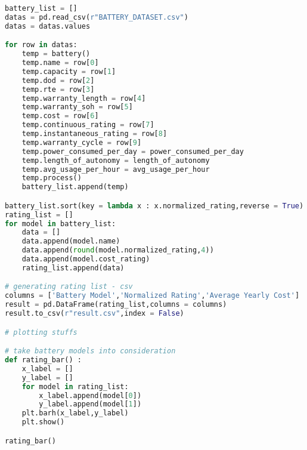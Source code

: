 \begin{lstlisting}[language=python]
battery_list = []
datas = pd.read_csv(r"BATTERY_DATASET.csv")
datas = datas.values

for row in datas:
    temp = battery()
    temp.name = row[0]
    temp.capacity = row[1]
    temp.dod = row[2]
    temp.rte = row[3]
    temp.warranty_length = row[4]
    temp.warranty_soh = row[5]
    temp.cost = row[6]
    temp.continuous_rating = row[7]
    temp.instantaneous_rating = row[8]
    temp.warranty_cycle = row[9]
    temp.power_consumed_per_day = power_consumed_per_day
    temp.length_of_autonomy = length_of_autonomy
    temp.avg_usage_per_hour = avg_usage_per_hour
    temp.process()
    battery_list.append(temp)

battery_list.sort(key = lambda x : x.normalized_rating,reverse = True)
rating_list = []
for model in battery_list:
    data = []
    data.append(model.name)
    data.append(round(model.normalized_rating,4))
    data.append(model.cost_rating)
    rating_list.append(data)

# generating rating list - csv
columns = ['Battery Model','Normalized Rating','Average Yearly Cost']
result = pd.DataFrame(rating_list,columns = columns)
result.to_csv(r"result.csv",index = False)

# plotting stuffs

# take battery models into consideration
def rating_bar() :
    x_label = []
    y_label = []
    for model in rating_list:
        x_label.append(model[0])
        y_label.append(model[1])
    plt.barh(x_label,y_label)
    plt.show()

rating_bar()
\end{lstlisting}